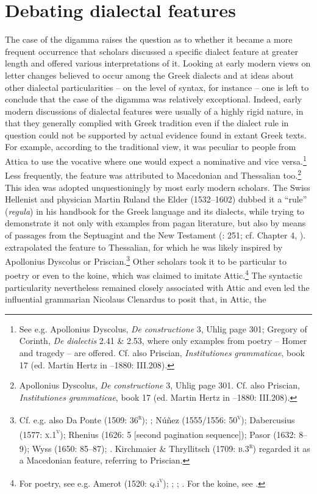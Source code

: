 \section{Debating dialectal features}

The case of the digamma raises the question as to whether it became a more frequent occurrence that scholars discussed a specific dialect feature at greater length and offered various interpretations of it. Looking at early modern views on letter changes believed to occur among the Greek dialects and at ideas about other dialectal particularities – on the level of syntax, for instance – one is left to conclude that the case of the digamma was relatively exceptional. Indeed, early modern discussions of dialectal features were usually of a highly rigid nature, in that they generally complied with Greek tradition even if the dialect rule in question could not be supported by actual evidence found in extant Greek texts. For example, according to the traditional view, it was peculiar to people from Attica to use the vocative where one would expect a nominative and vice versa.\footnote{See e.g. Apollonius Dyscolus, \textit{De} \textit{constructione} 3, Uhlig page 301; Gregory of Corinth, \textit{De} \textit{dialectis} 2.41 \& 2.53, where only examples from poetry – Homer and tragedy – are offered. Cf. also Priscian, \textit{Institutiones} \textit{grammaticae}, book 17 (ed. Martin Hertz in \citealt{Keil1855}–1880: III.208).} Less frequently, the feature was attributed to Macedonian and Thessalian too.\footnote{Apollonius Dyscolus, \textit{De} \textit{constructione} 3, Uhlig page 301. Cf. also Priscian, \textit{Institutiones} \textit{grammaticae}, book 17 (ed. Martin Hertz in \citealt{Keil1855}–1880: III.208).} This idea was adopted unquestioningly by most early modern scholars. The Swiss Hellenist and physician Martin Ruland the Elder (1532–1602) dubbed it a “rule” (\textit{regula}) in his handbook for the Greek language and its dialects, while trying to demonstrate it not only with examples from pagan literature, but also by means of passages from the Septuagint and the New Testament (\citealt{Ruland1556}: 251; cf. Chapter 4, ). \citet[302]{Ruland1556} extrapolated the feature to Thessalian, for which he was likely inspired by Apollonius Dyscolus or Priscian.\footnote{Cf. e.g. also Da Ponte (1509: 36\textsc{\textsuperscript{r}}); \citet[216]{Vergara1537}; Núñez (1555/1556: 50\textsc{\textsuperscript{v}}); Dabercusius (1577: \textsc{x.1}\textsc{\textsuperscript{v}}); Rhenius (1626: 5 [second pagination sequence]); Pasor (1632: 8–9); Wyss (1650: 85–87); \citet[88]{Leusden1670}. Kirchmaier \& Thryllitsch (1709: \textsc{b.3}\textsc{\textsuperscript{r}}) regarded it as a Macedonian feature, referring to Priscian.} Other scholars took it to be particular to poetry or even to the koine, which was claimed to imitate Attic.\footnote{For poetry, see e.g. Amerot (1520: \textsc{q.}i\textsc{\textsuperscript{v}}); \citet[129]{Antesignanus1554}; \citet[34]{Gretser1593}; \citet[157]{Schmidt1604}. For the koine, see \citet[54]{Lancelot1655}.} The syntactic particularity nevertheless remained closely associated with Attic and even led the influential grammarian Nicolaus Clenardus to posit that, in Attic, the 
